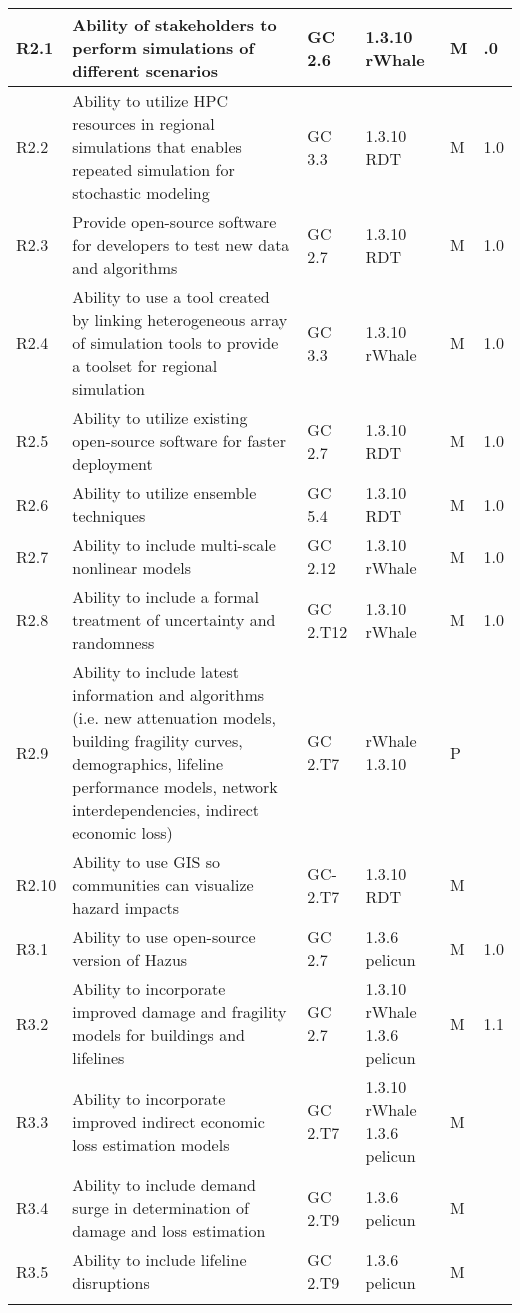 \begin{longtable}{|  C{.07\textwidth} | p{.5\textwidth} | C{.08\textwidth} | C{.09\textwidth} | C{.08\textwidth} | C{.08\textwidth} |}
R2.1 & Ability of stakeholders to perform simulations of different scenarios & GC 2.6 & 1.3.10 rWhale & M & .0 \\ \hline
R2.2 &  Ability to utilize HPC resources in regional simulations that enables repeated simulation for stochastic modeling & GC 3.3 & 1.3.10 RDT & M & 1.0 \\ \hline
R2.3 &  Provide open-source software for developers to test new data and algorithms & GC 2.7 & 1.3.10 RDT & M & 1.0  \\ \hline
R2.4 & Ability to use a tool created by linking heterogeneous array of simulation tools to provide a toolset for regional simulation & GC 3.3 & 1.3.10 rWhale & M & 1.0 \\ \hline
R2.5 &  Ability to utilize existing open-source software for faster deployment & GC 2.7 & 1.3.10 RDT & M & 1.0 \\ \hline
R2.6 &  Ability to utilize ensemble techniques  & GC 5.4 & 1.3.10 RDT & M & 1.0 \\ \hline
R2.7  & Ability to include multi-scale nonlinear models & GC 2.12 & 1.3.10 rWhale & M & 1.0 \\ \hline
R2.8 & Ability to include a formal treatment of uncertainty and randomness & GC 2.T12 & 1.3.10 rWhale & M & 1.0 \\ \hline
R2.9 & Ability to include latest information and algorithms (i.e. new attenuation models, building fragility curves, demographics, lifeline performance models, network interdependencies, indirect economic loss)
& GC 2.T7 & rWhale 1.3.10 & P & \\ \hline
R2.10 &  Ability to use GIS so communities can visualize hazard impacts & GC-2.T7 & 1.3.10 RDT & M & \\ \hhline{======}

R3.1& Ability to use open-source version of Hazus & GC 2.7 & 1.3.6 pelicun & M & 1.0 \\ \hline
R3.2 &  Ability to incorporate improved damage and fragility models for buildings and lifelines & GC 2.7 & 1.3.10 rWhale 1.3.6 pelicun & M & 1.1 \\ \hline
R3.3 &  Ability to incorporate improved indirect economic loss estimation models & GC 2.T7 & 1.3.10 rWhale 1.3.6 pelicun & M & \\ \hline
R3.4 & Ability to include demand surge in determination of damage and loss estimation & GC 2.T9 & 1.3.6 pelicun & M & \\ \hline
R3.5 & Ability to include lifeline disruptions & GC 2.T9 & 1.3.6 pelicun & M & \\ \hhline{======}



\end{longtable}
